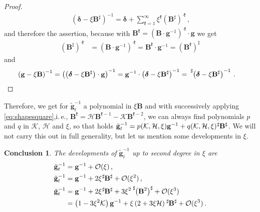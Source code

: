 \documentclass[a4paper,11pt]{scrartcl}
\newcommand{\landau}{\mathcal{O}}
\newcommand{\gb}{\mathbf{g}}
\newcommand{\tgb}{\tilde{\gb}}
\newcommand{\Bb}{\mathbf{B}}
\newcommand{\deltab}{\bm{\delta}}
\newcommand{\meanc}{\mathcal{H}}
\newcommand{\gaussc}{\mathcal{K}}
\newcommand{\frakk}{\mathfrak{k}}
\newcommand{\formComma}{\,\text{,}}
\newcommand{\formPeriod}{\,\text{.}}
\newcommand{\ie}{i.\,e.}%
\newtheorem{conclusion}{Conclusion}
\begin{document}
\begin{proof}
  \begin{align}
    \left( \deltab - \xi\Bb^{\sharp} \right)^{-1} = \deltab + \sum_{\frakk = 1}^{\infty}\xi^{\frakk}\left( \Bb^{\sharp} \right)^{\cdot\frakk} \formComma
  \end{align}
  and therefore the assertion, 
  because 
  with \( \Bb^{\frakk}  = \left( \Bb\cdot\gb^{-1} \right)^{\cdot\frakk} \cdot \gb\) we get
  \begin{align}
    \left( \Bb^{\sharp} \right)^{\cdot\frakk} &= \left( \Bb\cdot\gb^{-1} \right)^{\cdot\frakk} = \Bb^{\frakk}\cdot\gb^{-1} = \left( \Bb^{\frakk} \right)^{\sharp}
  \end{align}
  and
  \begin{align}
    \left( \gb - \xi\Bb \right)^{-1} 
          &= \left( \left( \deltab - \xi\Bb^{\sharp} \right)\cdot \gb \right)^{-1}
          = \gb^{-1} \cdot \left( \deltab - \xi\Bb^{\sharp} \right)^{-1}
          = \tensor[^{\sharp}]{\left( \deltab - \xi\Bb^{\sharp} \right)}{^{-1}} \formPeriod
  \end{align}
\end{proof}
Therefore, we get for \( \tgb_{t}^{-1} \) a polynomial in \( \xi\Bb \) and with successively applying \eqref{eq:shapesquare},\ie,
\( \Bb^{\frakk} = \meanc\Bb^{\frakk-1} - \gaussc\Bb^{\frakk-2} \), we can always find
polynomials \( p \) and \( q \) in \( \gaussc \), \( \meanc \) and \( \xi \), so that holds
\( \tgb_{t}^{-1} = p(\gaussc, \meanc, \xi)\gb^{-1} + q(\gaussc, \meanc, \xi)\tensor[^{\sharp}]{\Bb}{^{\sharp}} \).
We will not carry this out in full generality, but let us mention some developments in \( \xi \).
\begin{conclusion}
  The developments of \( \tgb_{t}^{-1} \) up to second degree in \( \xi \) are
  \begin{align}
    \tgb_{t}^{-1} &= \gb^{-1} + \landau(\xi)\formComma\\
    \tgb_{t}^{-1} &= \gb^{-1} + 2\xi\tensor[^{\sharp}]{\Bb}{^{\sharp}} + \landau(\xi^{2})\formComma \\
    \tgb_{t}^{-1} &= \gb^{-1} + 2\xi\tensor[^{\sharp}]{\Bb}{^{\sharp}} +  3\xi^{2}\tensor[^{\sharp}]{\left( \Bb^{2} \right)}{^{\sharp}} + \landau(\xi^{3})\\
                  &= \left( 1 - 3 \xi^{2}\gaussc \right)\gb^{-1} + \xi\left( 2 + 3\xi\meanc \right)\tensor[^{\sharp}]{\Bb}{^{\sharp}} + \landau(\xi^{3}) \formPeriod
  \end{align}
\end{conclusion}
\end{document}
